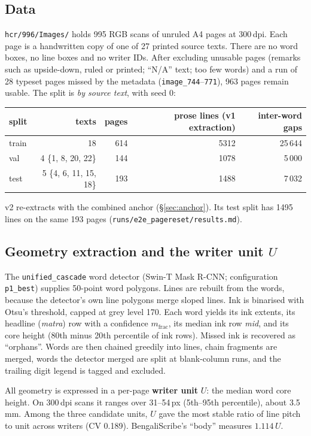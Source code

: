 \documentclass[11pt,a4paper]{article}
\newcommand{\U}{\ensuremath{U}}
\newcommand{\src}[1]{{\footnotesize\texttt{#1}}}
\begin{document}
\subsection{Data}
\texttt{hcr/996/Images/} holds 995 RGB scans of unruled A4 pages at 300\,dpi.
Each page is a handwritten copy of one of 27 printed source texts. There are no
word boxes, no line boxes and no writer IDs. After excluding unusable pages
(remarks such as upside-down, ruled or printed; ``N/A'' text; too few words) and
a run of 28 typeset pages missed by the metadata (\texttt{image\_744}--\texttt{771}),
963 pages remain usable. The split is \emph{by source text}, with seed 0:
\begin{center}
\begin{tabular}{lrrrr}
\toprule
split & texts & pages & prose lines (v1 extraction) & inter-word gaps\\
\midrule
train & 18 & 614 & 5312 & 25\,644\\
val   & 4 \{1, 8, 20, 22\} & 144 & 1078 & 5\,000\\
test  & 5 \{4, 6, 11, 15, 18\} & 193 & 1488 & 7\,032\\
\bottomrule
\end{tabular}
\end{center}
v2 re-extracts with the combined anchor (\S\ref{sec:anchor}). Its test split has
1495 lines on the same 193 pages (\src{runs/e2e\_pagereset/results.md}).

\subsection{Geometry extraction and the writer unit \U}
The \texttt{unified\_cascade} word detector (Swin-T Mask R-CNN; configuration
\texttt{p1\_best}) supplies 50-point word polygons. Lines are rebuilt from the
words, because the detector's own line polygons merge sloped lines. Ink is
binarised with Otsu's threshold, capped at grey level 170. Each word yields its
ink extents, its headline (\emph{matra}) row with a confidence
$m_\text{frac}$, its median ink row \textit{mid}, and its core height (80th
minus 20th percentile of ink rows). Missed ink is recovered as ``orphans''.
Words are then chained greedily into lines, chain fragments are merged, words
the detector merged are split at blank-column runs, and the trailing digit
legend is tagged and excluded.

All geometry is expressed in a per-page \textbf{writer unit} $\U$: the median
word core height. On 300\,dpi scans it ranges over 31--54\,px (5th--95th
percentile), about 3.5\,mm. Among the three candidate units, $\U$ gave the most
stable ratio of line pitch to unit across writers (CV 0.189). BengaliScribe's
``body'' measures $1.114\,\U$.
\end{document}
